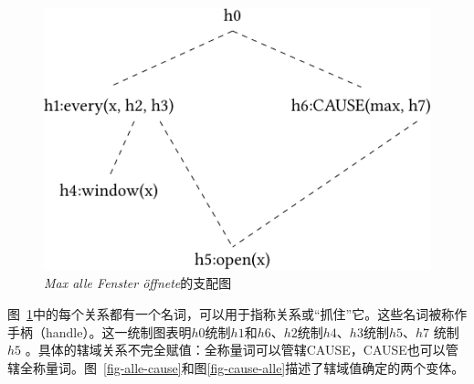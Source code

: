 \begin{figure}
\centering
\includegraphics{Figures/max-alle-fenster-oeffnete-mrs-cropped.pdf}
\caption{\emph{Max alle Fenster öffnete}的支配图\label{Abbildung-Max-alle-Fenster-oeffnete}}
\end{figure}%
图~\ref{Abbildung-Max-alle-Fenster-oeffnete}中的每个关系都有一个名词，可以用于指称关系或“抓住”它。这些名词被称作手柄（handle）。这一统制图表明$h0$统制$h1$和$h6$、$h2$统制$h4$、$h3$统制$h5$、$h7$ 统制$h5$ 。具体的辖域关系不完全赋值：全称量词可以管辖CAUSE，CAUSE也可以管辖全称量词。图~\ref{fig-alle-cause}和图\ref{fig-cause-alle}描述了辖域值确定的两个变体。
